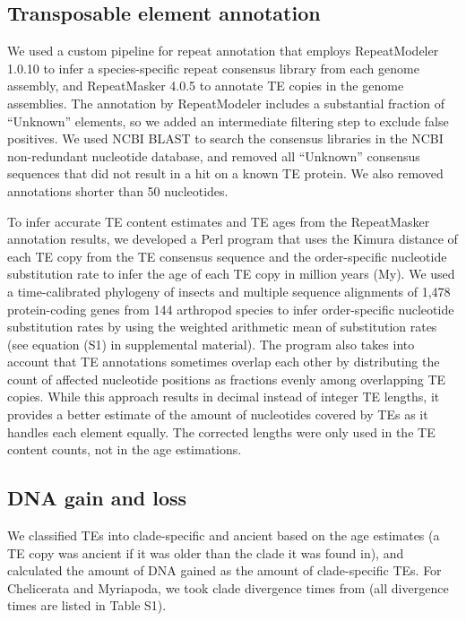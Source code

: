 \subsection{Transposable element
annotation}

We used a custom pipeline for repeat annotation that employs
RepeatModeler 1.0.10 \citep{Smit2015} to infer a species-specific
repeat consensus library from each genome assembly, and RepeatMasker
4.0.5 \citep{Smit2015a} to annotate TE copies in the genome
assemblies. The annotation by RepeatModeler includes a substantial
fraction of ``Unknown'' elements, so we added an intermediate filtering
step to exclude false positives. We used NCBI BLAST to search the
consensus libraries in the NCBI non-redundant nucleotide database, and
removed all ``Unknown'' consensus sequences that did not result in a hit
on a known TE protein. We also removed annotations shorter than 50
nucleotides.

To infer accurate TE content estimates and TE ages from the RepeatMasker
annotation results, we developed a Perl program that uses the Kimura
distance of each TE copy from the TE consensus sequence and the
order-specific nucleotide substitution rate to infer the age of each TE
copy in million years (My). We used a time-calibrated phylogeny of
insects \citep{Misof2014} and multiple sequence alignments of 1,478
protein-coding genes from 144 arthropod species \citep{Misof2014} to
infer order-specific nucleotide substitution rates by using the weighted
arithmetic mean of substitution rates (see equation (S1) in supplemental
material). The program also takes into account that TE annotations
sometimes overlap each other by distributing the count of affected
nucleotide positions as fractions evenly among overlapping TE copies.
While this approach results in decimal instead of integer TE lengths, it
provides a better estimate of the amount of nucleotides covered by TEs
as it handles each element equally. The corrected lengths were only used
in the TE content counts, not in the age estimations.

\subsection{DNA gain and loss}

We classified TEs into clade-specific and ancient based on the age
estimates (a TE copy was ancient if it was older than the clade it was
found in), and calculated the amount of DNA gained as the amount of
clade-specific TEs. For Chelicerata and Myriapoda, we took clade
divergence times from \citet{Misof2014} (all divergence times are
listed in Table S1).

